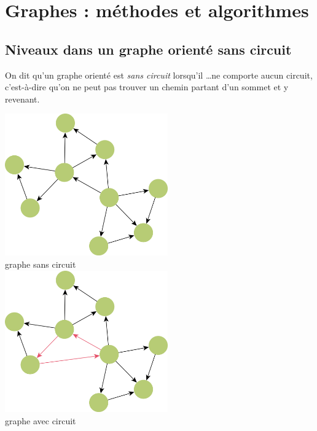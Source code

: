 \chapter{Graphes : méthodes et algorithmes}

\section{Niveaux dans un graphe orienté sans circuit}

On dit qu'un graphe orienté est \textit{sans circuit} lorsqu'il \dots ne comporte aucun circuit, c'est-à-dire qu'on ne peut pas trouver un chemin partant d'un sommet et y revenant.


\begin{multicols}{2}
    \begin{center}
        \includegraphics[width=7cm]{graphes2/img/graphe_sans_circuit.png}\\ \footnotesize graphe sans circuit\\
        \includegraphics[width=7cm]{graphes2/img/graphe_avec_circuit.png}\\ \footnotesize graphe avec circuit
    \end{center}
\end{multicols}

